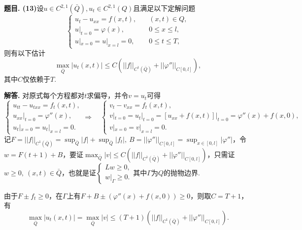 \documentclass[12pt, a4paper, oneside]{ctexart}
\newcounter{problem}  %
\newenvironment{problem}[1][]{\stepcounter{problem}\par\noindent\textbf{题目\arabic{problem}. #1}}{\smallskip\par}
\newenvironment{solution}[1][]{\par\noindent\textbf{#1解答. }}{\smallskip\par}  %
\let\leq=\leqslant %
\let\geq=\geqslant %
\def\add{\vspace{1ex}}      %
\def\del{\vspace{-1.5ex}}   %
\begin{document}
\begin{problem}[(13)]设$u\in C^{2,1}(\bar{Q}),u_t\in C^{2,1}(Q)$且满足以下定解问题
    \begin{equation*}
        \begin{cases}
            u_t-u_{xx} = f(x,t),&\quad (x,t)\in Q,\\
            u|_{t=0}=\varphi(x),&\quad 0\leq x\leq l,\\
            u|_{x=0}=u|_{x=l}=0,&\quad 0\leq t\leq T,
        \end{cases}
    \end{equation*}
    则有以下估计
    \begin{equation*}
        \max_{\bar{Q}}|u_t(x,t)|\leq C(||f||_{C^1(\bar{Q})}+||\varphi''||_{C[0,l]}),
    \end{equation*}
    其中$C$仅依赖于$T$.
\end{problem}
\begin{solution}
    对原式每个方程都对$t$求偏导，并令$v = u_t$可得
    \begin{equation*}
        \begin{cases}
            u_{tt}-u_{txx}=f_t(x,t),\\
            u_{xx}|_{t=0}= \varphi''(x),\\
            u_{t}|_{x=0}=u_t|_{x=l} = 0.
        \end{cases}\Rightarrow\quad\begin{cases}
            v_t-v_{xx}=f_{t}(x,t),\\
            v|_{t=0} = u_t|_{t=0} = [u_{xx}+f(x,t)]|_{t=0} = \varphi''(x)+f(x,0),\\
            v|_{x=0} = v|_{x=l} = 0.
        \end{cases}
    \end{equation*}
    记$F = ||f||_{C^1(\bar{Q})} = \sup_{\bar{Q}}|f|+\sup_{\bar{Q}}|f_t|,\ B = ||\varphi''||_{C[0,l]} = \sup_{x\in[0,l]}|\varphi''|$，令$w = F(t+1)+B$，要证$\max_{\bar{Q}}|v|\leq C(||f||_{C^1(\bar{Q})}+||\varphi''||_{C[0,l]})$，只需证$w\geq 0,\ (x,t)\in \bar{Q}$，也就是证$\begin{cases}
        Lw\geq 0,\\
        w|_\Gamma\geq 0.
    \end{cases}$其中$\Gamma$为$Q$的抛物边界.\add
    
    由于$F\pm f_t\geq 0$，在$\Gamma$上有$F+B\pm(\varphi''(x)+f(x,0))\geq 0$，则取$C = T+1$，有
    \begin{equation*}
        \max_{\bar{Q}}|u_t(x,t)|=\max_{\bar{Q}}|v| \leq (T+1)(||f||_{C^1(\bar{Q})}+||\varphi''||_{C[0,l]}).
    \end{equation*}\del\del
\end{solution}
\end{document}
